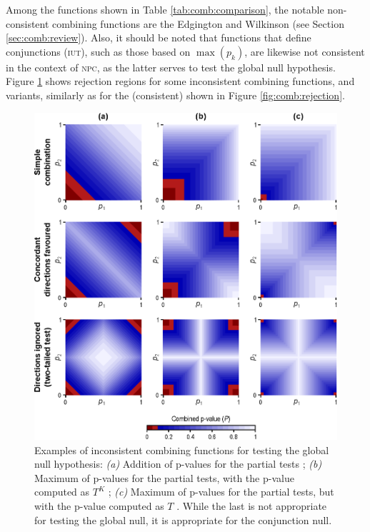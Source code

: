 Among the functions shown in Table \ref{tab:comb:comparison}, the notable non-consistent combining functions are the Edgington and Wilkinson (see Section \ref{sec:comb:review}). Also, it should be noted that functions that define conjunctions (\textsc{iut}), such as those based on $\max\left(p_k\right)$, are likewise not consistent in the context of \textsc{npc}, as the latter serves to test the global null hypothesis. Figure \ref{fig:comb:inconsistent} shows rejection regions for some inconsistent combining functions, and variants, similarly as for the (consistent) shown in Figure \ref{fig:comb:rejection}.

\begin{figure}[p]
\begin{center}
\centerline{\includegraphics[scale=.8]{images/inconsistent.eps}}
\end{center}
\caption[Examples of inconsistent combining functions.]{Examples of inconsistent combining functions for testing the global null hypothesis: \emph{(a)} Addition of p-values for the partial tests \citep{Edgington1972}; \emph{(b)} Maximum of p-values for the partial tests, with the p-value computed as $T^K$ \citep{Friston1999, Friston2005}; \emph{(c)} Maximum of p-values for the partial tests, but with the p-value computed as $T$ \citep{Nichols2005}. While the last is not appropriate for testing the global null, it is appropriate for the conjunction null.}
\label{fig:comb:inconsistent}
\end{figure}

